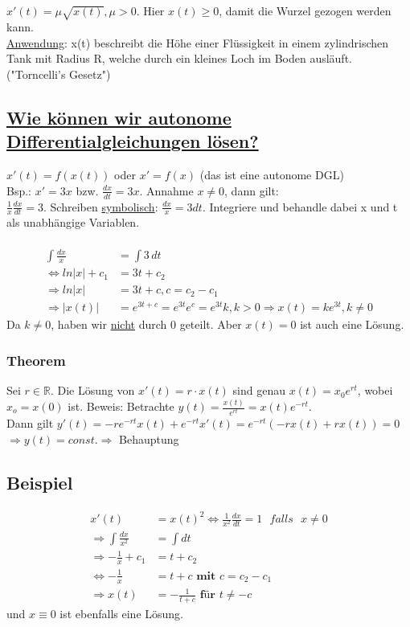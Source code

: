 \documentclass[12pt,a4paper]{article}
\begin{document}
\subsection{}
$x'(t) = \mu \sqrt{x(t)}, \mu > 0.$ Hier $x(t) \geq 0$, damit die Wurzel gezogen werden kann. \\ \underline{Anwendung}: x(t) beschreibt die Höhe einer Flüssigkeit in einem zylindrischen Tank mit Radius R, welche durch ein kleines Loch im Boden ausläuft. ("Torncelli's Gesetz") \\
\subsection{\underline{Wie können wir autonome Differentialgleichungen lösen?}}
$x'(t) = f(x(t))$ oder $x' = f(x)$ (das ist eine autonome DGL) \\
Bsp.: $x' = 3x$ bzw. $\frac{dx}{dt} = 3x$. Annahme $x \neq 0$, dann gilt: \\
$\frac{1}{x} \frac{dx}{dt} = 3$. Schreiben \underline{symbolisch}: $\frac{dx}{x} = 3 dt$. Integriere und behandle dabei x und t als unabhängige Variablen. \\ \\
\begin{align*}
\int \frac{dx}{x}  &=  \int 3 \, dt \\
\Leftrightarrow ln|x| + c_1 &= 3t+c_2 \\
\Rightarrow ln|x| &= 3t + c, c = c_2 - c_1 \\
\Rightarrow |x(t)| &= e^{3t+c} = e^{3t}e^c = e^{3t}k, k > 0 \Rightarrow x(t) = k e^{3t}, k \neq 0
\end{align*}
Da $k \neq 0$, haben wir \underline{nicht} durch 0 geteilt. Aber $x(t) = 0$ ist auch eine Lösung.
\subsubsection{Theorem}
Sei $r \in \mathbb{R}$. Die Lösung von $x'(t) = r \cdot x(t)$ sind genau $x(t) = x_0e^{rt}$, wobei $x_o = x(0)$ ist.
Beweis: Betrachte $y(t) = \frac{x(t)}{e^{rt}} = x(t) e^{-rt}$. \\
Dann gilt $y'(t) = -re^{-rt}x(t) + e^{-rt}x'(t) = e^{-rt}(-rx(t)+rx(t)) = 0$ \\
$\Rightarrow y(t) = const. \Rightarrow$ Behauptung
\subsection{Beispiel}
\begin{align*}
x'(t) &= x(t)^2 \Leftrightarrow \frac{1}{x^2} \frac{dx}{dt} = 1 \textbf{ } falls \textbf{ } x \neq 0 \\
\Rightarrow \int \frac{dx}{x^2} &= \int dt \\
\Rightarrow -\frac{1}{x} + c_1 &= t + c_2 \\
\Leftrightarrow -\frac{1}{x} &= t+c \textbf{ mit } c = c_2-c_1 \\
\Rightarrow x(t) &= -\frac{1}{t+c} \textbf{ für } t \neq -c
\end{align*}
und $x \equiv 0$ ist ebenfalls eine Lösung.
\end{document}
